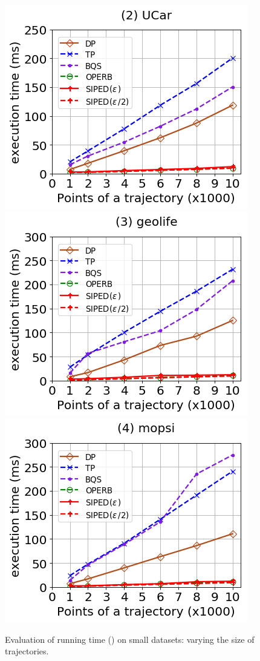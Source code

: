 \begin{figure}[tb!]
	\centering
	\includegraphics[scale=0.320]{Figures/Exp-PED-time-size-service.png}	\hspace{3ex}
	\includegraphics[scale=0.320]{Figures/Exp-PED-time-size-geolife.png}	\hspace{3ex}
	\includegraphics[scale=0.320]{Figures/Exp-PED-time-size-mopsi.png}	
	\vspace{-2ex}
	\caption{\small Evaluation of running time (\ped) on small datasets: varying the size of trajectories.}\label{fig:time-size-ped}
	\vspace{-2ex}
\end{figure}

